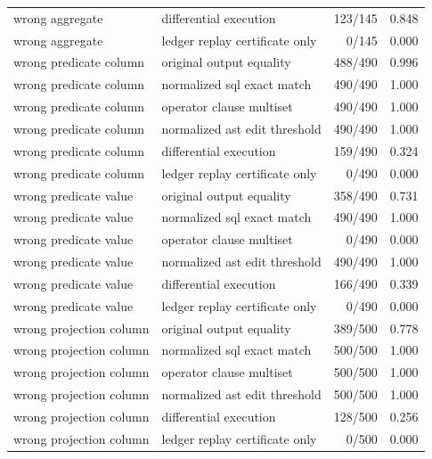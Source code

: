 \begin{tabular}{llrr}
wrong aggregate & differential execution & 123/145 & 0.848 \\
wrong aggregate & ledger replay certificate only & 0/145 & 0.000 \\
wrong predicate column & original output equality & 488/490 & 0.996 \\
wrong predicate column & normalized sql exact match & 490/490 & 1.000 \\
wrong predicate column & operator clause multiset & 490/490 & 1.000 \\
wrong predicate column & normalized ast edit threshold & 490/490 & 1.000 \\
wrong predicate column & differential execution & 159/490 & 0.324 \\
wrong predicate column & ledger replay certificate only & 0/490 & 0.000 \\
wrong predicate value & original output equality & 358/490 & 0.731 \\
wrong predicate value & normalized sql exact match & 490/490 & 1.000 \\
wrong predicate value & operator clause multiset & 0/490 & 0.000 \\
wrong predicate value & normalized ast edit threshold & 490/490 & 1.000 \\
wrong predicate value & differential execution & 166/490 & 0.339 \\
wrong predicate value & ledger replay certificate only & 0/490 & 0.000 \\
wrong projection column & original output equality & 389/500 & 0.778 \\
wrong projection column & normalized sql exact match & 500/500 & 1.000 \\
wrong projection column & operator clause multiset & 500/500 & 1.000 \\
wrong projection column & normalized ast edit threshold & 500/500 & 1.000 \\
wrong projection column & differential execution & 128/500 & 0.256 \\
wrong projection column & ledger replay certificate only & 0/500 & 0.000 \\
\bottomrule
\end{tabular}
